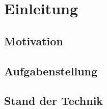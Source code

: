 
\chapter{Einleitung}
\label{einleitung_cha}


\section{Motivation}
\label{motivation_sec}
\authorsection{\editordummy}



\section{Aufgabenstellung}
\label{aufgabenstellung_sec}
\authorsection{\editordummy}


\section{Stand der Technik}
\label{stand_der_technik_sec}
\authorsection{\editordummy}

